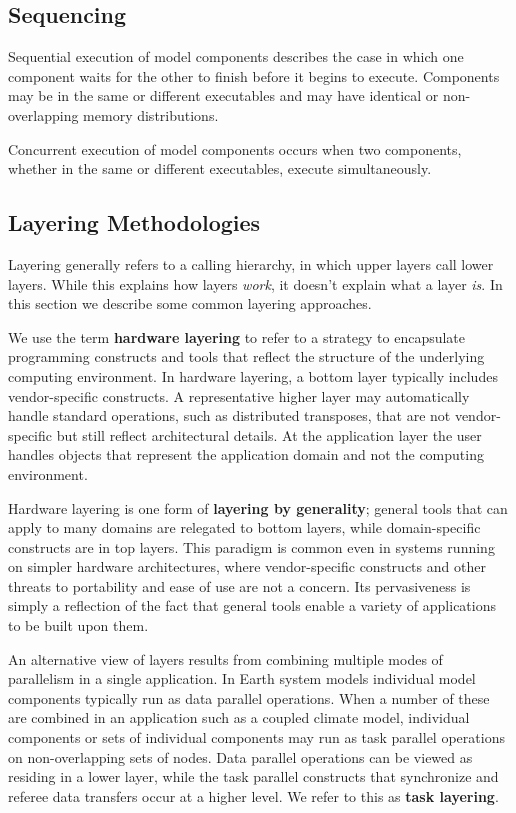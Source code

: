 \subsection{Sequencing}

Sequential execution of model components describes the case in which 
one component waits for the other to finish before it begins
to execute.  Components may be in the same or different executables
and may have identical or non-overlapping memory distributions.

Concurrent execution of model components occurs when two components,
whether in the same or different executables, execute simultaneously.

\subsection{Layering Methodologies}

Layering generally refers to a calling hierarchy, in which upper layers 
call lower layers.  While this explains how layers {\it work}, it doesn't 
explain what a layer {\it is}.  In this section we describe some common 
layering approaches.  

We use the term {\bf hardware layering} to refer to a strategy to encapsulate 
programming constructs and tools that reflect the structure of the underlying 
computing environment.  In hardware layering, a bottom layer typically includes 
vendor-specific constructs.  A representative higher layer may automatically 
handle standard operations, such as distributed transposes, that are not  
vendor-specific but still reflect architectural details.  At the application layer 
the user handles objects that represent the application 
domain and not the computing environment.  

Hardware layering is one form of {\bf layering by generality}; general 
tools that can apply to many domains are relegated to bottom layers, 
while domain-specific constructs are in top layers.  This paradigm is
common even in systems running on simpler hardware architectures, where vendor-specific
constructs and other threats to portability and ease of use are not a concern.
Its pervasiveness is simply a reflection of the fact that general tools 
enable a variety of applications to be built upon them.

An alternative view of layers results from combining multiple modes of parallelism 
in a single application.  In Earth system models individual model 
components typically run as data parallel operations.  When a number of 
these are combined in an application such as a coupled climate model, individual 
components or sets of individual components may run as task parallel operations 
on non-overlapping sets of nodes.  Data parallel operations can be viewed
as residing in a lower layer, while the task parallel constructs that 
synchronize and referee data transfers occur at a higher level. We refer to 
this as {\bf task layering}.

